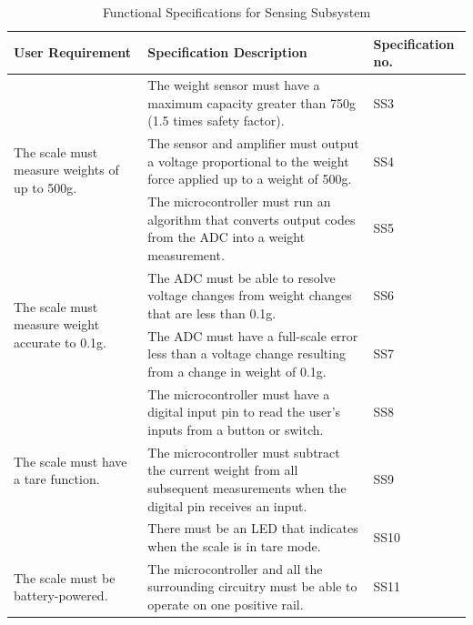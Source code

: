 \documentclass[class=report,11pt,crop=false]{standalone}
\begin{document}
\begin{longtable}[c]{|p{}|p{}|p{}|}
	\caption{Functional Specifications for Sensing Subsystem}
	\label{tab:S2}\\
	\hline
	\textbf{User   Requirement}                                        & \textbf{Specification   Description}                                                                                              & \textbf{Specification   no.} \\ \hline
	\endfirsthead
	\endhead
	\multirow{3}{.25\textwidth}{The scale   must measure weights of up to 500g.}   & The weight   sensor must have a maximum capacity greater than 750g (1.5 times safety   factor).                                   & SS3                          \\ \cline{2-3} 
	& The sensor   and amplifier must output a voltage proportional to the weight force applied   up to a weight of 500g.               & SS4                          \\ \cline{2-3} 
	& The microcontroller   must run an algorithm that converts output codes from the ADC into a weight   measurement.                  & SS5                          \\ \hline
	\multirow{2}{.25\textwidth}{The scale must   measure weight accurate to 0.1g.} & The ADC must   be able to resolve voltage changes from weight changes that are less than   0.1g.                                  & SS6                          \\ \cline{2-3} 
	& The ADC must   have a full-scale error less than a voltage change resulting from a change in   weight of 0.1g.                    & SS7                          \\ \hline
	\multirow{3}{.25\textwidth}{The scale   must have a tare function.}            & The   microcontroller must have a digital input pin to read the user’s inputs from   a button or switch.                          & SS8                          \\ \cline{2-3} 
	& The   microcontroller must subtract the current weight from all subsequent   measurements when the digital pin receives an input. & SS9                          \\ \cline{2-3} 
	& There must be   an LED that indicates when the scale is in tare mode.                                                             & SS10                         \\ \hline
	The scale   must be battery-powered.                               & The   microcontroller and all the surrounding circuitry must be able to operate on   one positive rail.                           & SS11                         \\ \hline
\end{longtable}
	
\end{document}
